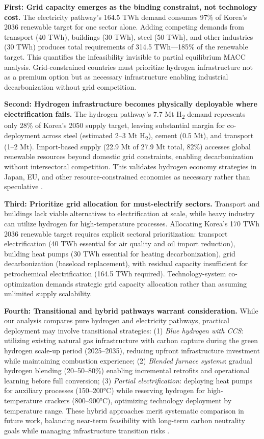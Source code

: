 \documentclass[11pt,a4paper]{article}
\begin{document}
\textbf{First: Grid capacity emerges as the binding constraint, not technology cost.} The electricity pathway's 164.5 TWh demand consumes 97\% of Korea's 2036 renewable target for one sector alone. Adding competing demands from transport (40 TWh), buildings (30 TWh), steel (50 TWh), and other industries (30 TWh) produces total requirements of 314.5 TWh---185\% of the renewable target. This quantifies the infeasibility invisible to partial equilibrium MACC analysis. Grid-constrained countries must prioritize hydrogen infrastructure not as a premium option but as necessary infrastructure enabling industrial decarbonization without grid competition.

\textbf{Second: Hydrogen infrastructure becomes physically deployable where electrification fails.} The hydrogen pathway's 7.7 Mt H\textsubscript{2} demand represents only 28\% of Korea's 2050 supply target, leaving substantial margin for co-deployment across steel (estimated 2--3 Mt H\textsubscript{2}), cement (0.5 Mt), and transport (1--2 Mt). Import-based supply (22.9 Mt of 27.9 Mt total, 82\%) accesses global renewable resources beyond domestic grid constraints, enabling decarbonization without intersectoral competition. This validates hydrogen economy strategies in Japan, EU, and other resource-constrained economies as necessary rather than speculative \citep{Kim2023,Fajardy2022}.

\textbf{Third: Prioritize grid allocation for must-electrify sectors.} Transport and buildings lack viable alternatives to electrification at scale, while heavy industry can utilize hydrogen for high-temperature processes. Allocating Korea's 170 TWh 2036 renewable target requires explicit sectoral prioritization: transport electrification (40 TWh essential for air quality and oil import reduction), building heat pumps (30 TWh essential for heating decarbonization), grid decarbonization (baseload replacement), with residual capacity insufficient for petrochemical electrification (164.5 TWh required). Technology-system co-optimization demands strategic grid capacity allocation rather than assuming unlimited supply scalability.

\textbf{Fourth: Transitional and hybrid pathways warrant consideration.} While our analysis compares pure hydrogen and electricity pathways, practical deployment may involve transitional strategies: (1) \textit{Blue hydrogen with CCS}: utilizing existing natural gas infrastructure with carbon capture during the green hydrogen scale-up period (2025--2035), reducing upfront infrastructure investment while maintaining combustion experience; (2) \textit{Blended furnace systems}: gradual hydrogen blending (20--50--80\%) enabling incremental retrofits and operational learning before full conversion; (3) \textit{Partial electrification}: deploying heat pumps for auxiliary processes (150--200°C) while reserving hydrogen for high-temperature crackers (800--900°C), optimizing technology deployment by temperature range. These hybrid approaches merit systematic comparison in future work, balancing near-term feasibility with long-term carbon neutrality goals while managing infrastructure transition risks \citep{Bataille2023,MaterialEconomics2023}.
\end{document}
